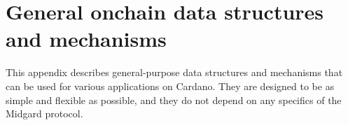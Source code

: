 \documentclass[../midgard.tex]{subfiles}
\begin{document}
\chapter{General onchain data structures and mechanisms}
\label{h:general-onchain-data-structures-and-mechanisms}

This appendix describes general-purpose data structures and mechanisms that can be used for various applications on Cardano.
They are designed to be as simple and flexible as possible, and they do not depend on any specifics of the Midgard protocol.
\end{document}

